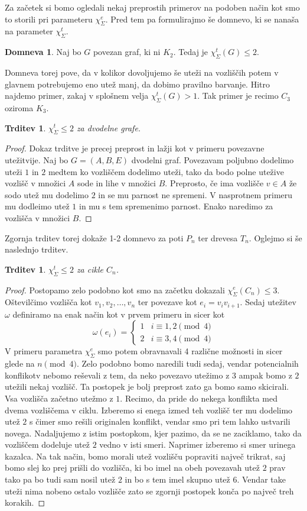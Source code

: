 \documentclass[12pt,a4paper,twoside]{article}
\theoremstyle{definition} %
\newtheorem{domneva}[definicija]{Domneva}
\theoremstyle{plain} %
\newtheorem{trditev}[definicija]{Trditev}
\newcommand{\ec}{\chi_{\Sigma}^e}
\newcommand{\ect}{\chi_{\Sigma}^t}
\numberwithin{equation}{section}  %
\begin{document}
Za začetek si bomo ogledali nekaj preprostih primerov na podoben način kot smo to storili pri parameteru $\ec$. Pred tem pa formulirajmo še domnevo, ki se nanaša na parameter $\ect$.
\begin{domneva} 
	\label{12conjecture}
	Naj bo $G$ povezan graf, ki ni $K_2$. Tedaj je $\ect(G) \le 2.$ 
\end{domneva}
Domneva torej pove, da v kolikor dovoljujemo še uteži na vozliščih potem v glavnem potrebujemo eno utež manj, da dobimo pravilno barvanje. Hitro najdemo primer, zakaj v splošnem velja $\ect(G) > 1$. Tak primer je recimo $C_3$ oziroma $K_3$.
\begin{trditev}
$\ect \le 2$ za dvodelne grafe.
\end{trditev}
\begin{proof}
Dokaz trditve je precej preprost in lažji kot v primeru povezavne utežitvije. Naj bo $G = (A,B, E)$ dvodelni graf. Povezavam  poljubno dodelimo uteži $1$ in $2$ medtem ko vozliščem dodelimo uteži, tako da bodo polne utežive vozlišč v množici $A$ sode in lihe v množici $B$. Preprosto, če ima vozlišče $v \in A$ že sodo utež mu dodelimo $2$ in se mu parnost ne spremeni. V nasprotnem primeru mu dodleimo utež $1$ in mu s tem spremenimo parnost. Enako naredimo za vozlišča v množici $B$.
\end{proof}
Zgornja trditev torej dokaže 1-2 domnevo za poti $P_n$ ter drevesa $T_n$. Oglejmo si še naslednjo trditev.
\begin{trditev}
$\ect \le 2$ za cikle $C_n$.
\end{trditev}
\begin{proof}
Postopamo zelo podobno kot smo na začetku dokazali $\ec(C_n) \le 3$. Oštevilčimo vozlišča kot $v_1, v_2, \ldots, v_n$ ter povezave kot $e_i = v_iv_{i+1}$. Sedaj utežitev $\omega$ definiramo na enak način kot v prvem primeru in sicer kot
\begin{equation*}
	\omega(e_i) = \begin{cases}
	1 &i \equiv 1,2 \pmod{4}\\ 
	2 &i \equiv 3,4 \pmod{4}
	\end{cases}
	\end{equation*}
V primeru parametra $\ec$ smo potem obravnavali 4 različne možnosti in sicer glede na $ n \pmod{4}$. Zelo podobno bomo naredili tudi sedaj, vendar potencialnih konflikotv nebomo reševali z tem, da neko povezavo utežimo z $3$ ampak bomo z $2$ utežili nekaj vozlišč. Ta postopek je bolj preprost zato ga bomo samo skicirali. Vsa vozlišča začetno utežmo z $1$. Recimo, da pride do nekega konflikta med dvema vozliščema v ciklu. Izberemo si enega izmed teh vozlišč ter mu dodelimo utež $2$ s čimer smo rešili originalen konflikt, vendar smo pri tem lahko ustvarili novega. Nadaljujemo z istim postopkom, kjer pazimo, da se ne zaciklamo, tako da vozliščem dodeluje utež $2$ vedno v isti smeri. Naprimer izberemo si smer urinega kazalca. Na tak način, bomo morali utež vozlišču popraviti največ trikrat, saj bomo slej ko prej prišli do vozlišča, ki bo imel na obeh povezavah utež $2$ prav tako pa bo tudi sam nosil utež $2$ in bo s tem imel skupno utež $6$. Vendar take uteži nima nobeno ostalo vozlišče zato se zgornji postopek konča po največ treh korakih.
\end{proof}
\end{document}
